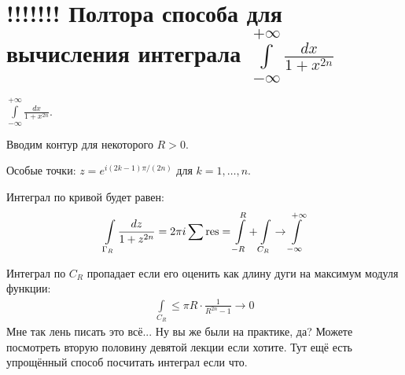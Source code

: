 \section{!!!!!!! Полтора способа для вычисления интеграла $\int\limits_{-\infty}^{+\infty} \frac{dx}{1+x^{2n}}$}

\begin{example}
    $\int\limits_{-\infty}^{+\infty} \frac{dx}{1+x^{2n}}$.

    Вводим контур для некоторого $R > 0$.
 
    \begin{center}
    \end{center}

    Особые точки: $z = e^{i(2k-1)\pi / (2n)}$ для $k = 1, \ldots, n$.

    Интеграл по кривой будет равен:
    \begin{gather*}
        \int\limits_{\Gamma_R} \frac{dz}{1+z^{2n}} = 2\pi i \sum \operatorname*{res}
        = \int\limits_{-R}^R + \int\limits_{C_R} \to \int\limits_{-\infty}^{+\infty}        
    \end{gather*}

    Интеграл по $C_R$ пропадает если его оценить
    как длину дуги на максимум модуля функции:
    \begin{gather*}
        \int\limits_{C_R} \le \pi R \cdot \frac{1}{R^{2n}-1} \to 0
    \end{gather*}
    Мне так лень писать это всё... Ну вы же были на практике, да?
    Можете посмотреть вторую половину девятой лекции если хотите.
    Тут ещё есть упрощённый способ посчитать интеграл если что.
\end{example}

\newpage

